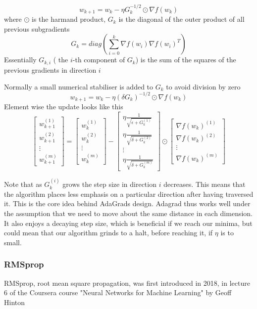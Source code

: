 \documentclass{article}
\begin{document}
\[ w_{k+1}= w_{k}-\eta G_{k}^{-1/2} \odot \nabla f(w_k) \]
where $\odot$ is the harmand product, $G_k$ is the diagonal of the outer product of all previous subgradients
\[
G_k = diag\left(\sum_{i = 0}^k \nabla f(w_i) \nabla f(w_i)^T\right)
\]
 Essentially  $G_{k,i}$ ( the $i$-th component of $G_k$) is the sum of the squares of the previous gradients in direction $i$

 Normally a small numerical stabiliser is added to $G_k$ to avoid division by zero
 \[
 w_{k+1}= w_{k}-\eta \left(\delta G_{k}\right)^{-1/2} \odot \nabla f(w_k)
 \]
 Element wise the update looks like this
 \[
 \begin{bmatrix}w_{k+1}^{(1)}\\w_{k+1}^{(2)}\\\vdots \\w_{k+1}^{(m)}\end{bmatrix}={\begin{bmatrix}w_{k}^{(1)}\\w_{k}^{(2)}\\\vdots \\w_{k}^{(m)}\end{bmatrix}}-{\begin{bmatrix}\eta {\frac {1}{\sqrt {\epsilon +G_{k}^{(1)}}}}\\\eta {\frac {1}{\sqrt {\delta  +G_{k}^{(2)}}}}\\\vdots \\\eta {\frac {1}{\sqrt {\delta +G_{k}^{(m)}}}}\end{bmatrix}}\odot \begin{bmatrix}\nabla f(w_k)^{(1)}\\\nabla f(w_k)^{(2)}\\\vdots \\\nabla f(w_k)^{(m)}\end{bmatrix}
 \]

Note that as $G_k^{(i)}$ grows the step size in direction $i$ decreases. This means that the algorithm places less emphasis on a particular direction after having traversed it. This is the core idea behind AdaGrads design. Adagrad thus works well under the assumption that we need to move about the same distance in each dimension. It also enjoys a decaying step size, which is beneficial if we reach our minima, but could mean that our algorithm grinds to a halt, before reaching it, if $\eta$ is to small.

\subsubsection{RMSprop}
RMSprop, root mean square propagation, was first introduced in 2018, in lecture 6 of the Coursera course "Neural Networks for Machine Learning" by Geoff Hinton
\cite{NNforML-Lecture6}
\end{document}
